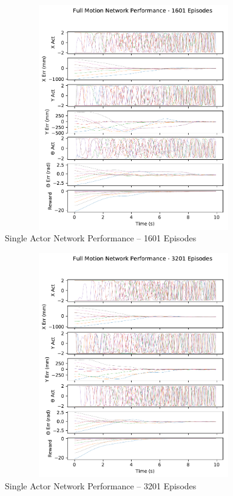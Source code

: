 \begin{figure}[H]
	\centering
	\includegraphics[width=6in, height=3.85in, keepaspectratio]{figures/train_figs/all_transitions/3_1601.pdf}
	\caption{Single Actor Network Performance -- 1601 Episodes}
\end{figure}
\begin{figure}[H]
	\centering
	\includegraphics[width=6in, height=3.85in, keepaspectratio]{figures/train_figs/all_transitions/3_3201.pdf}
	\caption{Single Actor Network Performance -- 3201 Episodes}
\end{figure}
